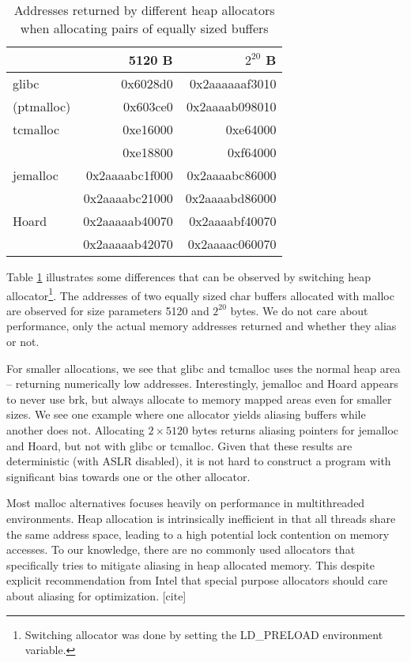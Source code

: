 \documentclass[a4paper,10pt,twocolumn,twoside]{article}
\begin{document}
{\begin{table}[t]
  \caption{Addresses returned by different heap allocators when allocating pairs of equally sized buffers}
  \label{tab:mallocompare}
  \centering
  \small
  \begin{tabular}{l r r}
    \toprule
                      & 5120 B          & $2^{20}$ B \\
    \midrule
    glibc             & 0x6028d0        & 0x2aaaaaaf3010 \\
    (ptmalloc)        & 0x603ce0        & 0x2aaaab098010 \\
    \midrule
    tcmalloc          & 0xe16000        & 0xe64000 \\
                      & 0xe18800        & 0xf64000 \\
    \midrule
    jemalloc          & 0x2aaaabc1f000  & 0x2aaaabc86000 \\
                      & 0x2aaaabc21000  & 0x2aaaabd86000 \\
    \midrule
    Hoard             & 0x2aaaaab40070  & 0x2aaaabf40070 \\
                      & 0x2aaaaab42070  & 0x2aaaac060070 \\
    \bottomrule
  \end{tabular}
\end{table}

Table \ref{tab:mallocompare} illustrates some differences that can be observed by switching heap allocator\footnote{Switching allocator was done by setting the LD\_PRELOAD environment variable.}.
The addresses of two equally sized char buffers allocated with malloc are observed for size parameters 5120 and $2^{20}$ bytes. 
We do not care about performance, only the actual memory addresses returned and whether they alias or not.

For smaller allocations, we see that glibc and tcmalloc uses the normal heap area -- returning numerically low addresses.
Interestingly, jemalloc and Hoard appears to never use brk, but always allocate to memory mapped areas even for smaller sizes.
We see one example where one allocator yields aliasing buffers while another does not. 
Allocating $2 \times 5120$ bytes returns aliasing pointers for jemalloc and Hoard, but not with glibc or tcmalloc.
Given that these results are deterministic (with ASLR disabled), it is not hard to construct a program with significant bias towards one or the other allocator.

Most malloc alternatives focuses heavily on performance in multithreaded environments.
Heap allocation is intrinsically inefficient in that all threads share the same address space, leading to a high potential lock contention on memory accesses.
To our knowledge, there are no commonly used allocators that specifically tries to mitigate aliasing in heap allocated memory.
This despite explicit recommendation from Intel that special purpose allocators should care about aliasing for optimization. [cite]

}
\end{document}
